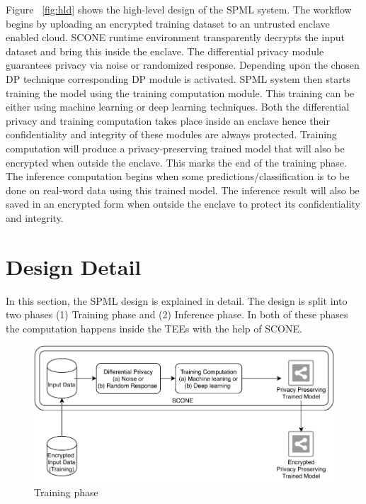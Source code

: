 Figure ~\ref{fig:hld} shows the high-level design of the SPML system. The workflow begins by uploading an encrypted training dataset to an untrusted enclave enabled cloud. SCONE runtime environment transparently decrypts the input dataset and bring this inside the enclave. The differential privacy module guarantees privacy via noise or randomized response. Depending upon the chosen DP technique corresponding DP module is activated. SPML system then starts training the model using the training computation module. This training can be either using machine learning or deep learning techniques. Both the differential privacy and training computation takes place inside an enclave hence their confidentiality and integrity of these modules are always protected. Training computation will produce a privacy-preserving trained model that will also be encrypted when outside the enclave. This marks the end of the training phase. The inference computation begins when some predictions/classification is to be done on real-word data using this trained model. The inference result will also be saved in an encrypted form when outside the enclave to protect its confidentiality and integrity.

\section{Design Detail}
In this section, the SPML design is explained in detail. The design is split into two phases (1) Training phase and (2) Inference phase. In both of these phases the computation happens inside the TEEs with the help of SCONE.
\begin{figure}
    \centering
    \includegraphics[width=\linewidth]{images/Training.pdf}
    \caption{Training phase}
    \label{fig:trainingDesign}
\end{figure}
